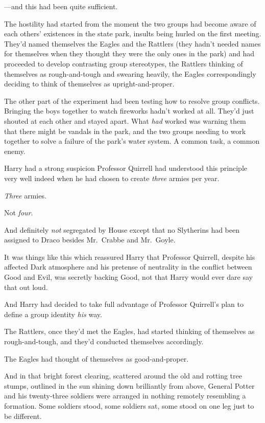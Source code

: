 ---and this had been quite sufficient.

The hostility had started from the moment the two groups had become aware of
each others' existences in the state park, insults being hurled on the first
meeting. They'd named themselves the Eagles and the Rattlers (they hadn't
needed names for themselves when they thought they were the only ones in the
park) and had proceeded to develop contrasting group stereotypes, the Rattlers
thinking of themselves as rough-and-tough and swearing heavily, the Eagles
correspondingly deciding to think of themselves as upright-and-proper.

The other part of the experiment had been testing how to resolve group
conflicts. Bringing the boys together to watch fireworks hadn't worked at all.
They'd just shouted at each other and stayed apart. What \emph{had} worked was
warning them that there might be vandals in the park, and the two groups
needing to work together to solve a failure of the park's water system. A
common task, a common enemy.

Harry had a strong suspicion Professor Quirrell had understood this principle
very well indeed when he had chosen to create \emph{three} armies per year.

\emph{Three} armies.

Not \emph{four}.

And definitely \emph{not} segregated by House{\el} except that no Slytherins
had been assigned to Draco besides Mr.~Crabbe and Mr.~Goyle.

It was things like this which reassured Harry that Professor Quirrell, despite
his affected Dark atmosphere and his pretense of neutrality in the conflict
between Good and Evil, was secretly backing Good, not that Harry would ever
dare say that out loud.

And Harry had decided to take full advantage of Professor Quirrell's plan to
define a group identity \emph{his} way.

The Rattlers, once they'd met the Eagles, had started thinking of themselves as
rough-and-tough, and they'd conducted themselves accordingly.

The Eagles had thought of themselves as good-and-proper.

And in that bright forest clearing, scattered around the old and rotting tree
stumps, outlined in the sun shining down brilliantly from above, General Potter
and his twenty-three soldiers were arranged in nothing remotely resembling a
formation. Some soldiers stood, some soldiers sat, some stood on one leg just
to be different.


